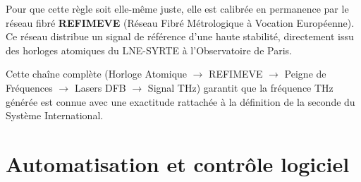 Pour que cette règle soit elle-même juste, elle est calibrée en permanence par le réseau fibré \textbf{REFIMEVE} (Réseau Fibré Métrologique à Vocation Européenne). Ce réseau distribue un signal de référence d'une haute stabilité, directement issu des horloges atomiques du LNE-SYRTE à l'Observatoire de Paris.

Cette chaîne complète (Horloge Atomique $\rightarrow$ REFIMEVE $\rightarrow$ Peigne de Fréquences $\rightarrow$ Lasers DFB $\rightarrow$ Signal THz) garantit que la fréquence THz générée est connue avec une exactitude rattachée à la définition de la seconde du Système International.

\section{Automatisation et contrôle logiciel}







